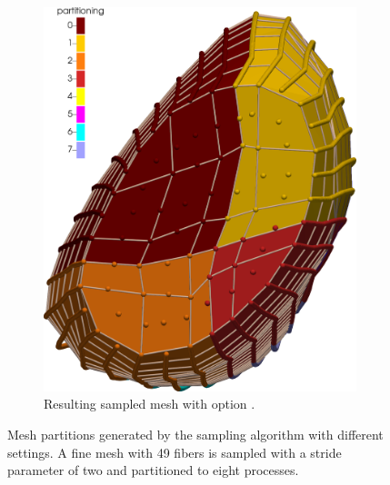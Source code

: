 \begin{figure}
\begin{subfigure}[t]{0.48\textwidth}
    \includegraphics[width=\textwidth]{images/implementation/partitioning3.png}
    \caption{Resulting sampled mesh with option .}%
    \label{fig:partitioning3}%
  \end{subfigure}
  \caption{Mesh partitions generated by the sampling algorithm with different settings. A fine mesh with 49 fibers is sampled with a stride parameter of two and partitioned to eight processes.}%
  \label{fig:partitioning3_4}%
\end{figure}%

